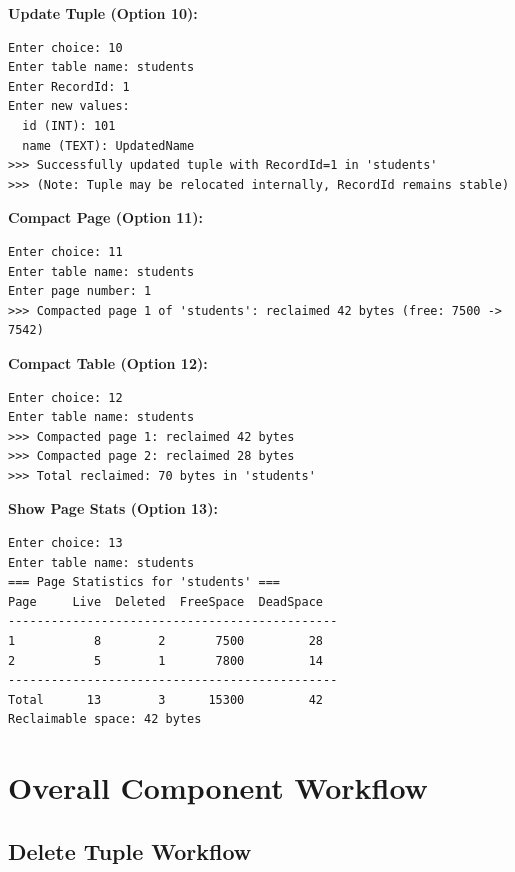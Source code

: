 \documentclass[11pt,a4paper]{article}
\begin{document}
\textbf{Update Tuple (Option 10):}
\begin{lstlisting}
Enter choice: 10
Enter table name: students
Enter RecordId: 1
Enter new values:
  id (INT): 101
  name (TEXT): UpdatedName
>>> Successfully updated tuple with RecordId=1 in 'students'
>>> (Note: Tuple may be relocated internally, RecordId remains stable)
\end{lstlisting}

\textbf{Compact Page (Option 11):}
\begin{lstlisting}
Enter choice: 11
Enter table name: students
Enter page number: 1
>>> Compacted page 1 of 'students': reclaimed 42 bytes (free: 7500 -> 7542)
\end{lstlisting}

\textbf{Compact Table (Option 12):}
\begin{lstlisting}
Enter choice: 12
Enter table name: students
>>> Compacted page 1: reclaimed 42 bytes
>>> Compacted page 2: reclaimed 28 bytes
>>> Total reclaimed: 70 bytes in 'students'
\end{lstlisting}

\textbf{Show Page Stats (Option 13):}
\begin{lstlisting}
Enter choice: 13
Enter table name: students
=== Page Statistics for 'students' ===
Page     Live  Deleted  FreeSpace  DeadSpace
----------------------------------------------
1           8        2       7500         28
2           5        1       7800         14
----------------------------------------------
Total      13        3      15300         42
Reclaimable space: 42 bytes
\end{lstlisting}

\section{Overall Component Workflow}

\subsection{Delete Tuple Workflow}
\end{document}

